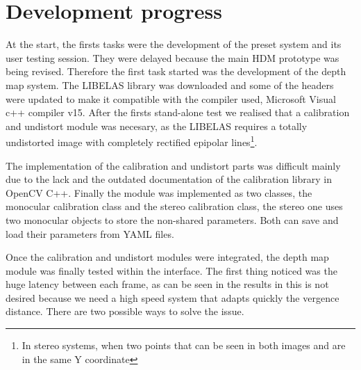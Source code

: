 \documentclass[10pt,a4paper,twocolumn,twoside]{article}
\begin{document}
	\section{Development progress}
	
	At the start, the firsts tasks were the development of the preset system and its user testing session. They were delayed because the main HDM prototype was being revised. Therefore the first task started was the development of the depth map system. The LIBELAS library was downloaded and some of the headers were updated to make it compatible with the compiler used, Microsoft Visual c++ compiler v15. After the firsts stand-alone test we realised that a calibration and undistort module was necesary, as the LIBELAS requires a totally undistorted image with completely rectified epipolar lines\footnote{In stereo systems, when two points that can be seen in both images and are in the same Y coordinate}. 
	
	The implementation of the calibration and undistort parts was difficult mainly due to the lack and the outdated documentation of the calibration library in OpenCV C++. Finally the module was implemented as two classes, the monocular calibration class and the stereo calibration class, the stereo one uses two monocular objects to store the non-shared parameters. Both can save and load their parameters from YAML files.
	
	Once the calibration and undistort modules were integrated, the depth map module was finally tested within the interface. 
	The first thing noticed was the huge latency between each frame, as can be seen in the results in  this is not desired because we need a high speed system that adapts quickly the vergence distance. There are two possible ways to solve the issue.
	
\end{document}
